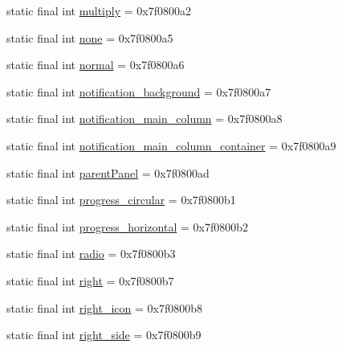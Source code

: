 \begin{DoxyCompactItemize}
\item 
static final int \mbox{\hyperlink{classandroid_1_1support_1_1v7_1_1appcompat_1_1_r_1_1id_a14cfaf6f4360cc8f1e3332ec93886e86}{multiply}} = 0x7f0800a2
\item 
static final int \mbox{\hyperlink{classandroid_1_1support_1_1v7_1_1appcompat_1_1_r_1_1id_a2b9b27749df31be95628596f649f3ca6}{none}} = 0x7f0800a5
\item 
static final int \mbox{\hyperlink{classandroid_1_1support_1_1v7_1_1appcompat_1_1_r_1_1id_a01096d8e5c89f3536cd9ff277e50aa6d}{normal}} = 0x7f0800a6
\item 
static final int \mbox{\hyperlink{classandroid_1_1support_1_1v7_1_1appcompat_1_1_r_1_1id_a9bbdf5432a3500d33bbeb37a51058389}{notification\+\_\+background}} = 0x7f0800a7
\item 
static final int \mbox{\hyperlink{classandroid_1_1support_1_1v7_1_1appcompat_1_1_r_1_1id_a73287491f4ceeb078845e8636a6635f1}{notification\+\_\+main\+\_\+column}} = 0x7f0800a8
\item 
static final int \mbox{\hyperlink{classandroid_1_1support_1_1v7_1_1appcompat_1_1_r_1_1id_a2bcf1e74994a4638238f397ad0922686}{notification\+\_\+main\+\_\+column\+\_\+container}} = 0x7f0800a9
\item 
static final int \mbox{\hyperlink{classandroid_1_1support_1_1v7_1_1appcompat_1_1_r_1_1id_a908539fdb58bb6e7cbd117c4fa035dab}{parent\+Panel}} = 0x7f0800ad
\item 
static final int \mbox{\hyperlink{classandroid_1_1support_1_1v7_1_1appcompat_1_1_r_1_1id_a78d6f86a1eb6df15a9a5c3b5afb779cf}{progress\+\_\+circular}} = 0x7f0800b1
\item 
static final int \mbox{\hyperlink{classandroid_1_1support_1_1v7_1_1appcompat_1_1_r_1_1id_a9a5f8b44cd3e0ce5f6792da6c4a7189d}{progress\+\_\+horizontal}} = 0x7f0800b2
\item 
static final int \mbox{\hyperlink{classandroid_1_1support_1_1v7_1_1appcompat_1_1_r_1_1id_a0e1e03a536bddb0929ed81811e746003}{radio}} = 0x7f0800b3
\item 
static final int \mbox{\hyperlink{classandroid_1_1support_1_1v7_1_1appcompat_1_1_r_1_1id_ab6d3c28d15e1a872e2e91fd4f21bdb73}{right}} = 0x7f0800b7
\item 
static final int \mbox{\hyperlink{classandroid_1_1support_1_1v7_1_1appcompat_1_1_r_1_1id_a1104bdea860d307012bf8f534ece89d7}{right\+\_\+icon}} = 0x7f0800b8
\item 
static final int \mbox{\hyperlink{classandroid_1_1support_1_1v7_1_1appcompat_1_1_r_1_1id_aba43ec3cde39bb68e15b155b4ba2a313}{right\+\_\+side}} = 0x7f0800b9

\end{DoxyCompactItemize}
